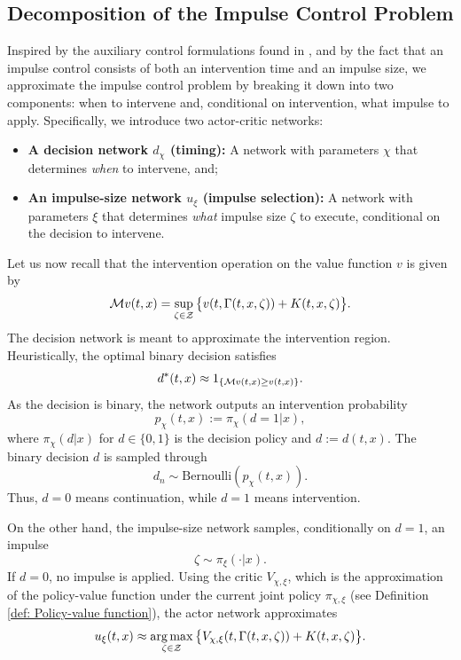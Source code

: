 \subsection{Decomposition of the Impulse Control Problem}
Inspired by the auxiliary control formulations found in \cite{jain2025impulse, mguni2022timing}, and by the fact that an impulse control consists of both an intervention time and an impulse size, we approximate the impulse control problem by breaking it down into two components: when to intervene and, conditional on intervention, what impulse to apply. Specifically, we introduce two actor-critic networks:
\begin{itemize}
    \item \textbf{A decision network $d_\chi$ (timing):} A network with parameters $\chi$ that determines \emph{when} to intervene, and;
    \item \textbf{An impulse-size network $u_\xi$ (impulse selection):} A network with parameters $\xi$ that determines \emph{what} impulse size $\zeta$ to execute, conditional on the decision to intervene.
\end{itemize}
Let us now recall that the intervention operation on the value function $v$ is given by
\begin{equation*}
    \mathcal{M} v(t,x) = \sup_{\zeta \in \mathcal{Z}} \big \{ v(t,\Gamma(t,x,\zeta)) + K(t,x,\zeta) \big\}. 
\end{equation*}
The decision network is meant to approximate the intervention region. Heuristically, the optimal binary decision satisfies
\begin{equation*}
    d^*(t,x) \approx 1_{\left\{\mathcal{M} v(t,x) \geq v(t,x)\right\}}. 
\end{equation*}
As the decision is binary, the network outputs an intervention probability
\begin{equation*}
    p_\chi(t,x) := \pi_\chi \left(d=1 | x\right),
\end{equation*}
where $\pi_\chi(d|x)$ for $d \in \{0,1\}$ is the decision policy and $d:=d(t,x)$. The binary decision $d$ is sampled through
\begin{equation*}
    d_n \sim \text{Bernoulli} \left(p_\chi(t,x)\right). 
\end{equation*}
Thus, $d = 0$ means continuation, while $d = 1$ means intervention. 

On the other hand, the impulse-size network samples, conditionally on $d = 1$, an impulse 
\begin{equation*}
    \zeta \sim \pi_\xi \left( \cdot | x \right). 
\end{equation*}
If $d = 0$, no impulse is applied. Using the critic $V_{\chi, \xi}$, which is the approximation of the policy-value function under the current joint policy $\pi_{\chi, \xi}$ (see Definition \ref{def: Policy-value function}), the actor network approximates
\begin{equation*}
    u_\xi(t,x) \approx \operatorname*{arg\,max}_{\zeta \in \mathcal{Z}} \big\{ V_{\chi, \xi}(t,\Gamma(t,x,\zeta)) + K(t,x,\zeta) \big\}. 
\end{equation*}


